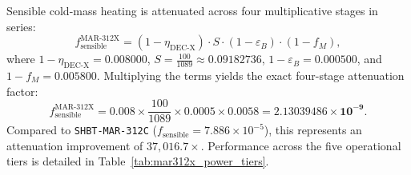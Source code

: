 \documentclass[11pt,onecolumn]{article}
\begin{document}
\FloatBarrier

Sensible cold-mass heating is attenuated across four multiplicative stages in series:
\begin{equation}
f_{\text{sensible}}^{\text{MAR-312X}} = (1 - \eta_{\text{DEC-X}}) \cdot S \cdot (1 - \varepsilon_B) \cdot (1 - f_M),
\label{eq:four_stage_thermal_chain}
\end{equation}
where $1 - \eta_{\text{DEC-X}} = 0.008000$, $S = \frac{100}{1089} \approx 0.09182736$, $1 - \varepsilon_B = 0.000500$, and $1 - f_M = 0.005800$. Multiplying the terms yields the exact four-stage attenuation factor:
\begin{equation}
f_{\text{sensible}}^{\text{MAR-312X}} = 0.008 \times \frac{100}{1089} \times 0.0005 \times 0.0058 = \mathbf{2.13039486 \times 10^{-9}}.
\label{eq:f_sensible_value}
\end{equation}
Compared to \texttt{SHBT-MAR-312C} ($f_{\text{sensible}} = 7.886 \times 10^{-5}$), this represents an attenuation improvement of $37{,}016.7\times$. Performance across the five operational tiers is detailed in Table~\ref{tab:mar312x_power_tiers}.

\FloatBarrier
\begin{table}[!htbp]
\centering\small
\caption{Operational Power Tiers and Cold-Mass Thermodynamic Response for \texttt{SHBT-MAR-312X}.}
\label{tab:mar312x_power_tiers}
\end{table}
\FloatBarrier
\end{document}

